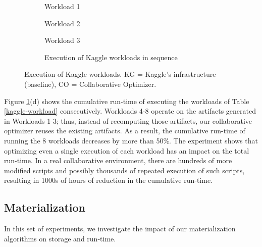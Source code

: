 \begin{figure}[h]
\begin{subfigure}[b]{0.33\linewidth}
\centering
 \resizebox{\columnwidth}{!}{%
%
}
\caption{Workload 1}
\end{subfigure}%
\begin{subfigure}[b]{0.33\linewidth}
\centering
 \resizebox{\columnwidth}{!}{%
%
}
\caption{Workload 2}
\end{subfigure}%
\begin{subfigure}[b]{0.33\linewidth}
\centering
 \resizebox{\columnwidth}{!}{%
%
}
\caption{Workload 3}
\end{subfigure}
\begin{subfigure}[b]{\linewidth}
\centering
 \resizebox{\columnwidth}{!}{%
%
}
\caption{Execution of Kaggle workloads in sequence}
\end{subfigure}
\caption{Execution of Kaggle workloads. KG = Kaggle's infrastructure (baseline), CO = Collaborative Optimizer.}
\label{exp-reuse-kaggle-same-workload}
\end{figure}

Figure \ref{exp-reuse-kaggle-same-workload}(d) shows the cumulative run-time of executing the workloads of Table \ref{kaggle-workload} consecutively.
Workloads 4-8 operate on the artifacts generated in Workloads 1-3; thus, instead of recomputing those artifacts, our collaborative optimizer reuses the existing artifacts.
As a result, the cumulative run-time of running the 8 workloads decreases by more than 50\%.
The experiment shows that optimizing even a single execution of each workload has an impact on the total run-time.
In a real collaborative environment, there are hundreds of more modified scripts and possibly thousands of repeated execution of such scripts, resulting in 1000s of hours of reduction in the cumulative run-time.
\subsection{Materialization}
In this set of experiments, we investigate the impact of our materialization algorithms on storage and run-time.

